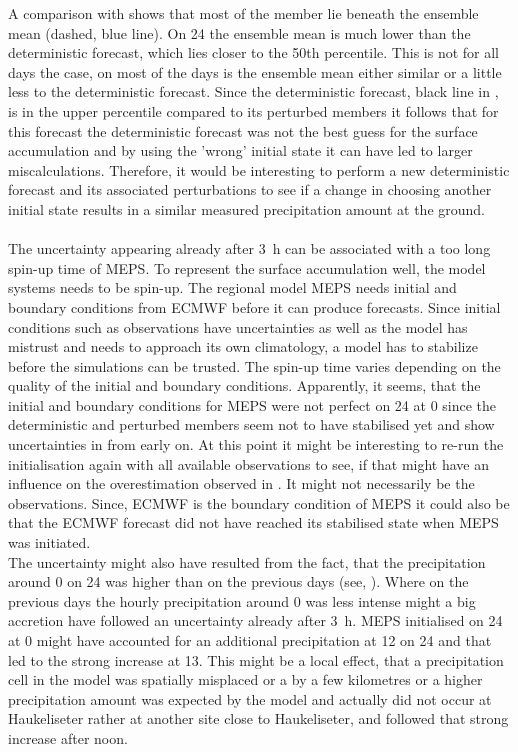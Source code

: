 A comparison with  shows that most of the member lie beneath the ensemble mean (dashed, blue line). On \SI{24}{\dec} the ensemble mean is much lower than the deterministic forecast, which lies closer to the 50th percentile. This is not for all days the case, on most of the days is the ensemble mean either similar or a little less to the deterministic forecast. Since the deterministic forecast, black line in , is in the upper percentile compared to its perturbed members it follows that for this forecast the deterministic forecast was not the best guess for the surface accumulation and by using the 'wrong' initial state it can have led to larger miscalculations. Therefore, it would be interesting to perform a new deterministic forecast and its associated perturbations to see if a change in choosing another initial state results in a similar measured precipitation amount at the ground.
\\
\\
The uncertainty appearing already after \SI{3}{\hour} can be associated with a too long spin-up time of MEPS. To represent the surface accumulation well, the model systems needs to be spin-up. The regional model MEPS needs initial and boundary conditions from ECMWF before it can produce forecasts. Since initial conditions such as observations have uncertainties as well as the model has mistrust and needs to approach its own climatology, a model has to stabilize before the simulations can be trusted. The spin-up time varies depending on the quality of the initial and boundary conditions. Apparently, it seems, that the initial and boundary conditions for MEPS were not perfect on \SI{24}{\dec} at \SI{0}{\UTC} since the deterministic and perturbed members seem not to have stabilised yet and show uncertainties in  from early on.  At this point it might be interesting to re-run the initialisation again with all available observations to see, if that might have an influence on the overestimation observed in . It might not necessarily be the observations. Since, ECMWF is the boundary condition of MEPS it could also be that the ECMWF forecast did not have reached its stabilised state when MEPS was initiated.
\\
The uncertainty might also have resulted from the fact, that the precipitation around \SI{0}{\UTC} on \SI{24}{\dec} was higher than on the previous days (see, ). Where on the previous days the hourly precipitation around \SI{0}{\UTC} was less intense might a big accretion have followed an uncertainty already after \SI{3}{\hour}. MEPS initialised on \SI{24}{\dec} at \SI{0}{\UTC} might have accounted for an additional precipitation at \SI{12}{\UTC} on \SI{24}{\dec} and that led to the strong increase at \SI{13}{\UTC}. This might be a local effect, that a precipitation cell in the model was spatially misplaced or a by a few kilometres or a higher precipitation amount was expected by the model and actually did not occur at Haukeliseter rather at another site close to Haukeliseter, and followed that strong increase after noon. 
